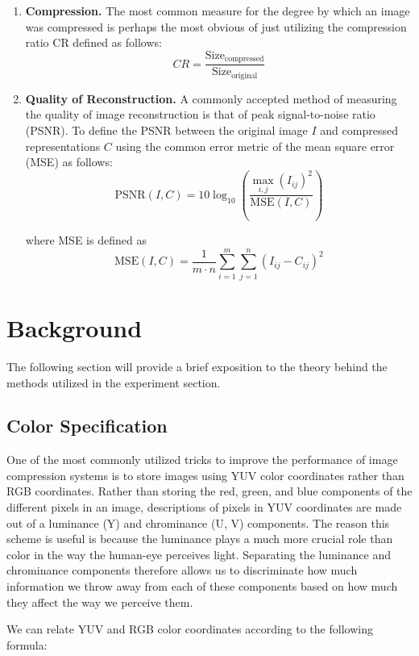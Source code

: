 \documentclass[review,onefignum,onetabnum]{siamart190516}
\begin{document}
\begin{enumerate}[label=\textbf{(\alph*)}]
  \item \textbf{Compression.} The most common measure for the degree by which an
  image was compressed is perhaps the most obvious of just utilizing the compression
  ratio CR defined as follows\cite{sayood2017introduction}:
  \[
    CR = \frac{\text{Size}_\text{compressed}}{\text{Size}_\text{original}}
  \]
  \item \textbf{Quality of Reconstruction.} A commonly accepted method of measuring
  the quality of image reconstruction is that of peak signal-to-noise ratio (PSNR).
  To define the PSNR between the original image $I$ and compressed representations $C$
  using the common error metric of the mean square error (MSE) as follows:
  \[
    \text{PSNR}(I, C) = 10 \log_{10}(\frac{\max_{i, j}(I_{ij})^2}{\text{MSE}(I, C)})
  \]

  where MSE is defined as
  \[
    \text{MSE}(I, C) = \frac{1}{m \cdot n} \sum_{i = 1}^m \sum_{j = 1}^n (I_{ij} - C_{ij})^2
  \]
\end{enumerate}

\section{Background}
The following section will provide a brief exposition to the theory behind the methods
utilized in the experiment section.

\subsection{Color Specification}
One of the most commonly utilized tricks to improve the performance of image compression
systems is to store images using YUV color coordinates rather than RGB coordinates.
Rather than storing the red, green, and blue components of the different pixels in 
an image, descriptions of pixels in YUV coordinates are made out of a luminance (Y)
and chrominance (U, V) components. The reason this scheme is useful is because the
luminance plays a much more crucial role than color in the way the human-eye 
perceives light. Separating the luminance and chrominance components therefore allows
us to discriminate how much information we throw away from each of these components
based on how much they affect the way we perceive them. \cite{podpora2014yuv}

We can relate YUV and RGB color coordinates according to the following formula:
\end{document}
